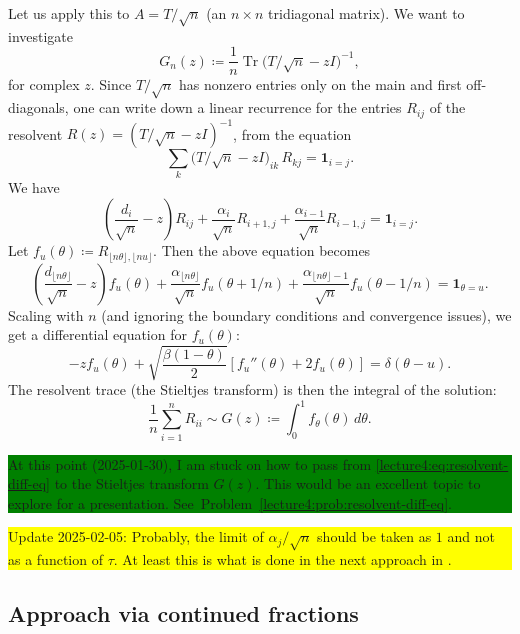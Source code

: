 \documentclass[letterpaper,11pt,oneside,reqno]{book}
\numberwithin{equation}{chapter}  %
\theoremstyle{definition}
\begin{document}
Let us apply this to \(A = T/\sqrt{n}\) (an $n\times n$ tridiagonal matrix).  We want
to investigate
\[
	G_n(z)\coloneqq \frac{1}{n}
	\operatorname{Tr}
  \bigl(T/\sqrt{n} - zI\bigr)^{-1},
\]
for complex \(z\).
 Since $T/\sqrt{n}$ has nonzero entries only on the main and first off-diagonals, one can write down a linear recurrence for the entries
$R_{ij}$
of the resolvent
$R(z)=(T/\sqrt{n}-z I)^{-1}$,
from the equation
\[
	\sum_{k}
	\bigl(T/\sqrt{n} - zI\bigr)_{ik}\,R_{kj}
  =
	\mathbf{1}_{i=j}.
\]
We have
\begin{equation*}
	\left(\frac{d_i}{\sqrt{n}}-z\right)R_{ij}
	+
	\frac{\alpha_i}{\sqrt{n}}R_{i+1,j}
	+
	\frac{\alpha_{i-1}}{\sqrt{n}}R_{i-1,j}=
	\mathbf{1}_{i=j}.
\end{equation*}
Let $f_u(\theta)\coloneqq R_{\lfloor n\theta \rfloor ,\lfloor nu \rfloor }$.
Then the above equation becomes
\begin{equation*}
	\left(\frac{d_{\lfloor n\theta \rfloor }}{\sqrt{n}}-z\right)f_u(\theta)
	+
	\frac{\alpha_{\lfloor n\theta \rfloor }}{\sqrt{n}}f_u(\theta+1/n)
	+
	\frac{\alpha_{\lfloor n \theta \rfloor -1}}{\sqrt{n}}f_u(\theta-1/n)=
	\mathbf{1}_{\theta=u}.
\end{equation*}
Scaling with $n$ (and ignoring the boundary conditions and convergence issues), we get
a differential equation for $f_u(\theta)$:
\begin{equation}
	\label{lecture4:eq:resolvent-diff-eq}
	-z f_u(\theta)+\sqrt{\frac{\beta(1-\theta)}{2}}
	\left[f_u''(\theta)+2f_u(\theta)\right]=\delta(\theta-u).
\end{equation}
The resolvent trace (the Stieltjes transform)
is then the integral of the solution:
\begin{equation*}
	\frac{1}{n}\sum_{i=1}^{n}R_{ii}
	\sim
	G(z)\coloneqq
	\int_0^1 f_\theta(\theta)\,d\theta.
\end{equation*}

\colorbox{green}{\parbox{.7\textwidth}{At this point (2025-01-30), I am stuck on how to pass from
\eqref{lecture4:eq:resolvent-diff-eq} to the Stieltjes transform $G(z)$.
This would be an excellent topic to explore for a presentation.
See~Problem~\ref{lecture4:prob:resolvent-diff-eq}.}}

\colorbox{yellow}{\parbox{.7\textwidth}{Update 2025-02-05: Probably,
the limit of $\alpha_j/\sqrt n$ should be taken as $1$ and not as a function of $\tau$.
At least this is what is done in the next approach in .}}


\subsection{Approach via continued fractions}
\label{lecture4:sub:continued-fractions}
\end{document}
